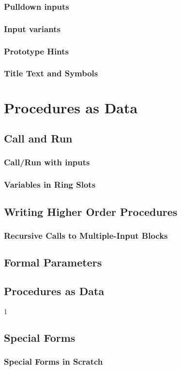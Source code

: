 \documentclass[a4paper]{report}
\begin{document}
\subsection{Pulldown inputs}
\subsection{Input variants}
\subsection{Prototype Hints}
\subsection{Title Text and Symbols}
\chapter{Procedures as Data}
\section{Call and Run}
\subsection{Call/Run with inputs}
\subsection{Variables in Ring Slots}
\section{Writing Higher Order Procedures}
\subsection{Recursive Calls to Multiple-Input Blocks}
\section{Formal Parameters}
\section{Procedures as Data}
1\section{Special Forms}
\subsection{Special Forms in Scratch}
\end{document}
